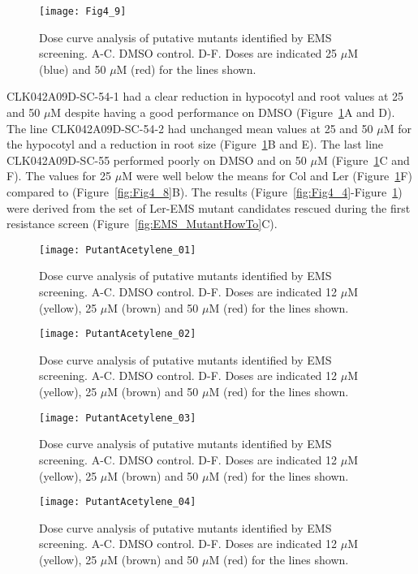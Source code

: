 \begin{figure}
\centering
\texttt{[image: Fig4\_9]}
\caption{Dose curve analysis of putative mutants identified by EMS screening. A-C. DMSO control. D-F. Doses are indicated 25 $\mu$M (blue) and 50 $\mu$M (red) for the lines shown.} 
\label{fig:Fig4_9}
\end{figure}

CLK042A09D-SC-54-1 had a clear reduction in hypocotyl and root values at 25 and 50 $\mu$M despite having a good performance on DMSO (Figure~\ref{fig:Fig4_9}A and D). The line CLK042A09D-SC-54-2 had unchanged mean values at 25 and 50 $\mu$M for the hypocotyl and a reduction in root size (Figure~\ref{fig:Fig4_9}B and E). The last line CLK042A09D-SC-55 performed poorly on DMSO and on 50 $\mu$M (Figure~\ref{fig:Fig4_9}C and F). The values for 25 $\mu$M were well below the means for Col and Ler (Figure~\ref{fig:Fig4_9}F) compared to (Figure~\ref{fig:Fig4_8}B). The results (Figure~\ref{fig:Fig4_4}-Figure~\ref{fig:Fig4_9}) were derived from the set of Ler-EMS mutant candidates rescued during the first resistance screen (Figure~\ref{fig:EMS_MutantHowTo}C).


\begin{figure}
\centering
\texttt{[image: PutantAcetylene\_01]}
\caption{Dose curve analysis of putative mutants identified by EMS screening. A-C. DMSO control. D-F. Doses are indicated 12 $\mu$M (yellow), 25 $\mu$M (brown) and 50 $\mu$M (red) for the lines shown.} 
\label{fig:Fig4_10}
\end{figure}

\begin{figure}
\centering
\texttt{[image: PutantAcetylene\_02]}
\caption{Dose curve analysis of putative mutants identified by EMS screening. A-C. DMSO control. D-F. Doses are indicated 12 $\mu$M (yellow), 25 $\mu$M (brown) and 50 $\mu$M (red) for the lines shown.} 
\label{fig:Fig4_11}
\end{figure}

\begin{figure}
\centering
\texttt{[image: PutantAcetylene\_03]}
\caption{Dose curve analysis of putative mutants identified by EMS screening. A-C. DMSO control. D-F. Doses are indicated 12 $\mu$M (yellow), 25 $\mu$M (brown) and 50 $\mu$M (red) for the lines shown.} 
\label{fig:Fig4_12}
\end{figure}

\begin{figure}
\centering
\texttt{[image: PutantAcetylene\_04]}
\caption{Dose curve analysis of putative mutants identified by EMS screening. A-C. DMSO control. D-F. Doses are indicated 12 $\mu$M (yellow), 25 $\mu$M (brown) and 50 $\mu$M (red) for the lines shown.} 
\label{fig:Fig4_13}
\end{figure}

